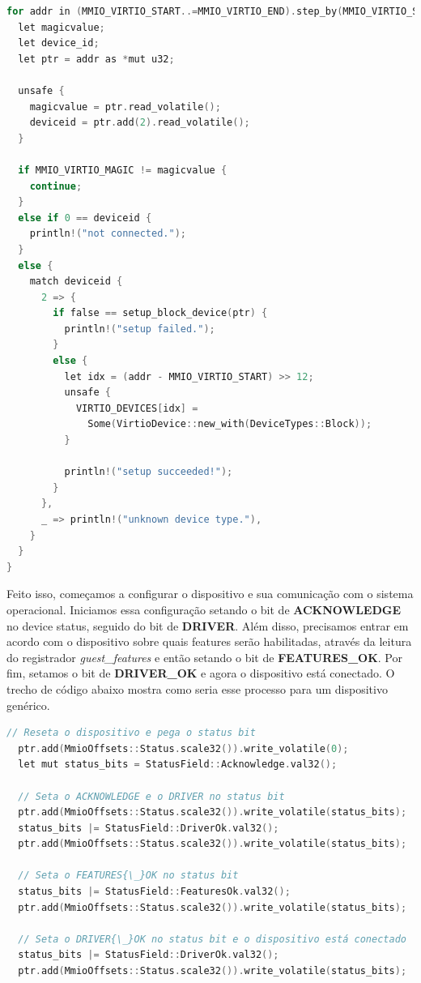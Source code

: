 \begin{lstlisting}[language=C]
for addr in (MMIO_VIRTIO_START..=MMIO_VIRTIO_END).step_by(MMIO_VIRTIO_STRIDE) {
  let magicvalue;
  let device_id;
  let ptr = addr as *mut u32;

  unsafe {
    magicvalue = ptr.read_volatile();
    deviceid = ptr.add(2).read_volatile();
  }

  if MMIO_VIRTIO_MAGIC != magicvalue {
    continue;
  }
  else if 0 == deviceid {
    println!("not connected.");
  }
  else {
    match deviceid {
      2 => {
        if false == setup_block_device(ptr) {
          println!("setup failed.");
        }
        else {
          let idx = (addr - MMIO_VIRTIO_START) >> 12;
          unsafe {
            VIRTIO_DEVICES[idx] =
              Some(VirtioDevice::new_with(DeviceTypes::Block));
          }

          println!("setup succeeded!");
        }
      },
      _ => println!("unknown device type."),
    }
  }
}
\end{lstlisting}

Feito isso, começamos a configurar o dispositivo e sua comunicação com o sistema operacional. Iniciamos essa configuração setando o bit de \textbf{ACKNOWLEDGE} no device status, seguido do bit de \textbf{DRIVER}.
Além disso, precisamos entrar em acordo com o dispositivo sobre quais features serão habilitadas, através da leitura do registrador \emph{guest{\_}features} e então setando o bit de \textbf{FEATURES{\_}OK}. 
Por fim, setamos o bit de \textbf{DRIVER{\_}OK} e agora o dispositivo está conectado. O trecho de código abaixo mostra como seria esse processo para um dispositivo genérico.

\begin{lstlisting}[language=C]
  // Reseta o dispositivo e pega o status bit
  ptr.add(MmioOffsets::Status.scale32()).write_volatile(0); 
  let mut status_bits = StatusField::Acknowledge.val32();

  // Seta o ACKNOWLEDGE e o DRIVER no status bit
  ptr.add(MmioOffsets::Status.scale32()).write_volatile(status_bits);
  status_bits |= StatusField::DriverOk.val32();
  ptr.add(MmioOffsets::Status.scale32()).write_volatile(status_bits);

  // Seta o FEATURES{\_}OK no status bit
  status_bits |= StatusField::FeaturesOk.val32();
  ptr.add(MmioOffsets::Status.scale32()).write_volatile(status_bits);

  // Seta o DRIVER{\_}OK no status bit e o dispositivo está conectado
  status_bits |= StatusField::DriverOk.val32();
  ptr.add(MmioOffsets::Status.scale32()).write_volatile(status_bits);
\end{lstlisting}

